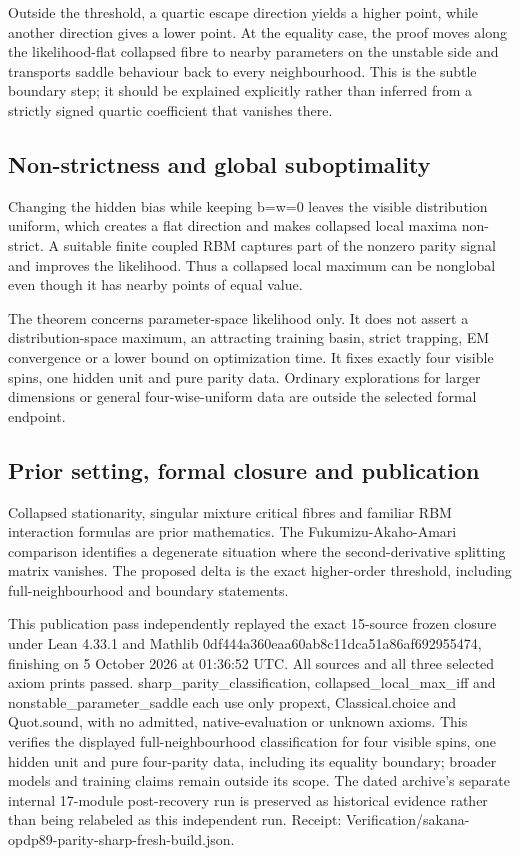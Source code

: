 \documentclass[11pt,a4paper]{article}
\begin{document}
Outside the threshold, a quartic escape direction yields a higher point, while another direction gives a lower point. At the equality case, the proof moves along the likelihood-flat collapsed fibre to nearby parameters on the unstable side and transports saddle behaviour back to every neighbourhood. This is the subtle boundary step; it should be explained explicitly rather than inferred from a strictly signed quartic coefficient that vanishes there.

\subsection{Non-strictness and global suboptimality}
Changing the hidden bias while keeping b=w=0 leaves the visible distribution uniform, which creates a flat direction and makes collapsed local maxima non-strict. A suitable finite coupled RBM captures part of the nonzero parity signal and improves the likelihood. Thus a collapsed local maximum can be nonglobal even though it has nearby points of equal value.

The theorem concerns parameter-space likelihood only. It does not assert a distribution-space maximum, an attracting training basin, strict trapping, EM convergence or a lower bound on optimization time. It fixes exactly four visible spins, one hidden unit and pure parity data. Ordinary explorations for larger dimensions or general four-wise-uniform data are outside the selected formal endpoint.

\subsection{Prior setting, formal closure and publication}
Collapsed stationarity, singular mixture critical fibres and familiar RBM interaction formulas are prior mathematics. The Fukumizu-Akaho-Amari comparison identifies a degenerate situation where the second-derivative splitting matrix vanishes. The proposed delta is the exact higher-order threshold, including full-neighbourhood and boundary statements.

This publication pass independently replayed the exact 15-source frozen closure under Lean 4.33.1 and Mathlib 0df444a360eaa60ab8c11dca51a86af692955474, finishing on 5 October 2026 at 01:36:52 UTC. All sources and all three selected axiom prints passed. sharp\_parity\_classification, collapsed\_local\_max\_iff and nonstable\_parameter\_saddle each use only propext, Classical.choice and Quot.sound, with no admitted, native-evaluation or unknown axioms. This verifies the displayed full-neighbourhood classification for four visible spins, one hidden unit and pure four-parity data, including its equality boundary; broader models and training claims remain outside its scope. The dated archive's separate internal 17-module post-recovery run is preserved as historical evidence rather than being relabeled as this independent run. Receipt: Verification/sakana-opdp89-parity-sharp-fresh-build.json.
\end{document}
